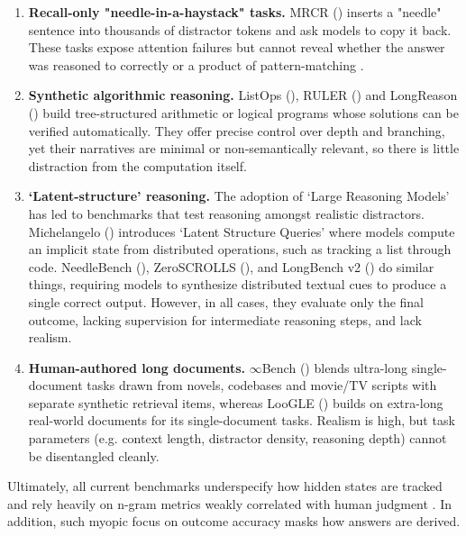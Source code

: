\documentclass{article}
\begin{document}
\begin{enumerate}
  \item \textbf{Recall-only "needle-in-a-haystack" tasks.}
        MRCR (\citeyear{Michelangelo}) inserts a "needle" sentence into thousands of distractor tokens and ask models to copy it back. These tasks expose attention failures but cannot reveal whether the answer was reasoned to correctly or a product of pattern-matching \citep{IllusionOfThinking}.

  \item \textbf{Synthetic algorithmic reasoning.}
        ListOps (\citeyear{listops}), RULER (\citeyear{ruler}) and LongReason (\citeyear{longreason}) build tree-structured arithmetic or logical programs whose solutions can be verified automatically. They offer precise control over depth and branching, yet their narratives are minimal or non-semantically relevant, so there is little distraction from the computation itself.

  \item \textbf{`Latent-structure' reasoning.}
        The adoption of `Large Reasoning Models' has led to benchmarks that test reasoning amongst realistic distractors. Michelangelo (\citeyear{Michelangelo}) introduces `Latent Structure Queries' where models compute an implicit state from distributed operations, such as tracking a list through code. NeedleBench (\citeyear{needlebench}), ZeroSCROLLS (\citeyear{zeroscrolls}), and LongBench v2 (\citeyear{longbench2}) do similar things, requiring models to synthesize distributed textual cues to produce a single correct output. However, in all cases, they evaluate only the final outcome, lacking supervision for intermediate reasoning steps, and lack realism.
  \item \textbf{Human-authored long documents.}
        $\infty$Bench (\citeyear{infinitebench}) blends ultra-long single-document tasks drawn from novels, codebases and movie/TV scripts with separate synthetic retrieval items, whereas LooGLE (\citeyear{loogle}) builds on extra-long real-world documents for its single-document tasks. Realism is high, but task parameters (e.g. context length, distractor density, reasoning depth) cannot be disentangled cleanly.

\end{enumerate}
Ultimately, all current benchmarks underspecify how hidden states are tracked and rely heavily on n-gram metrics weakly correlated with human judgment \citep{l-eval}. In addition, such myopic focus on outcome accuracy masks how answers are derived.
\end{document}
